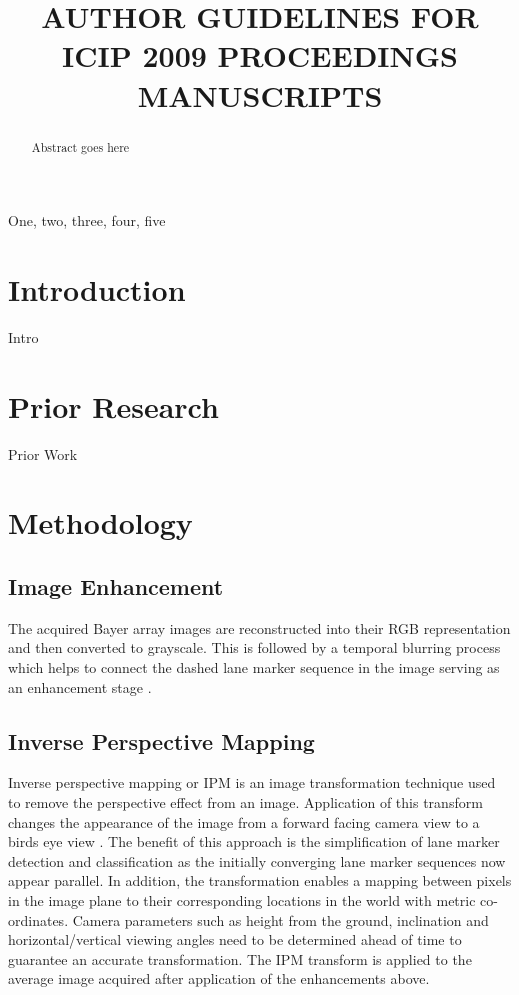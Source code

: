 \documentclass{article}
\title{AUTHOR GUIDELINES FOR ICIP 2009 PROCEEDINGS MANUSCRIPTS}
\begin{document}
%
\maketitle
%
\begin{abstract}
Abstract goes here
\end{abstract}
%
\begin{keywords}
One, two, three, four, five
\end{keywords}
%
\section{Introduction}
\label{sec:intro}
Intro

\section{Prior Research}
\label{sec:prior}
Prior Work

\section{Methodology}
\label{sec:methodology}

\subsection{Image Enhancement}
The acquired Bayer array images are reconstructed into their RGB representation and then converted to grayscale. This is followed by a temporal blurring process which helps to connect the dashed lane marker sequence in the image serving as an enhancement stage \cite{borkar_layered_2009}.

\subsection{Inverse Perspective Mapping}
Inverse perspective mapping or IPM is an image transformation technique used to remove the perspective effect from an image. Application of this transform changes the appearance of the image from a forward facing camera view to a birds eye view \cite{borkar_layered_2009,chen_target_2004}. The benefit of this approach is the simplification of lane marker detection and classification as the initially converging lane marker sequences now appear parallel. In addition, the transformation enables a mapping between pixels in the image plane to their corresponding locations in the world with metric co-ordinates. Camera parameters such as height from the ground, inclination and horizontal/vertical viewing angles need to be determined ahead of time to guarantee an accurate transformation. The IPM transform is applied to the average image acquired after application of the enhancements above.
\end{document}
